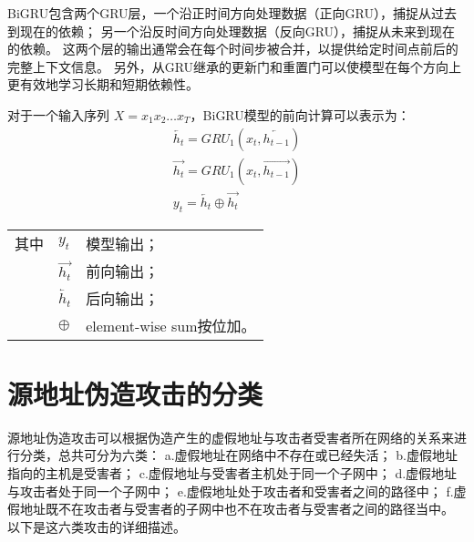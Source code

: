 BiGRU包含两个GRU层，一个沿正时间方向处理数据（正向GRU），捕捉从过去到现在的依赖；
另一个沿反时间方向处理数据（反向GRU），捕捉从未来到现在的依赖。
这两个层的输出通常会在每个时间步被合并，以提供给定时间点前后的完整上下文信息。
另外，从GRU继承的更新门和重置门可以使模型在每个方向上更有效地学习长期和短期依赖性。

对于一个输入序列 $X = x_1 x_2 \dots x_T$，BiGRU模型的前向计算可以表示为：
\begin{gather}
  \overleftarrow{h_t} = GRU_1(x_t,\overleftarrow{h_{t-1}}) \label{eq:bigru_htleft} \\
  \overrightarrow{h_t} = GRU_1(x_t,\overrightarrow{h_{t-1}}) \label{eq:bigru_htright} \\
  y_t = \overleftarrow{h_t} \oplus \overrightarrow{h_t} \label{eq:bigru_out}
\end{gather}
\begin{flushleft}
  \renewcommand\arraystretch{1.25}
  \begin{tabularx}{\textwidth}{@{}>{\normalsize\rm}l@{\quad}>{\normalsize\rm}l@{——}>{\normalsize\rm}X@{}}
  其中
  &  $y_t$ &模型输出；\\
  &  $\overrightarrow{h_t}$ &前向输出；\\
  &  $\overleftarrow{h_t} $ &后向输出；\\
  &  $\oplus$ & element-wise sum按位加。\\
  \end{tabularx}\vspace{.5ex}%
\end{flushleft}

\section{源地址伪造攻击的分类}

源地址伪造攻击可以根据伪造产生的虚假地址与攻击者受害者所在网络的关系来进行分类，总共可分为六类：
a.虚假地址在网络中不存在或已经失活；
b.虚假地址指向的主机是受害者；
c.虚假地址与受害者主机处于同一个子网中；
d.虚假地址与攻击者处于同一个子网中；
e.虚假地址处于攻击者和受害者之间的路径中；
f.虚假地址既不在攻击者与受害者的子网中也不在攻击者与受害者之间的路径当中\cite{Bi2010}。
以下是这六类攻击的详细描述。

